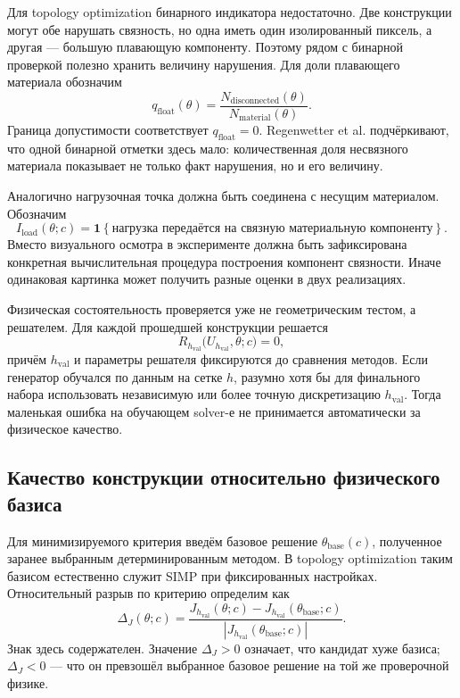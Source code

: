 Для topology optimization бинарного индикатора недостаточно. Две конструкции могут обе нарушать связность, но одна иметь один изолированный пиксель, а другая --- большую плавающую компоненту. Поэтому рядом с бинарной проверкой полезно хранить величину нарушения. Для доли плавающего материала обозначим
\begin{equation}
 q_{\mathrm{float}}(\theta)
 =
 \frac{N_{\mathrm{disconnected}}(\theta)}
 {N_{\mathrm{material}}(\theta)}.
\end{equation}
Граница допустимости соответствует $q_{\mathrm{float}}=0$. Regenwetter et al. подчёркивают, что одной бинарной отметки здесь мало: количественная доля несвязного материала показывает не только факт нарушения, но и его величину.

Аналогично нагрузочная точка должна быть соединена с несущим материалом. Обозначим
\begin{equation}
 I_{\mathrm{load}}(\theta;c)
 =
 \mathbf 1\!\left\{
  \text{нагрузка передаётся на связную материальную компоненту}
 \right\}.
\end{equation}
Вместо визуального осмотра в эксперименте должна быть зафиксирована конкретная вычислительная процедура построения компонент связности. Иначе одинаковая картинка может получить разные оценки в двух реализациях.

Физическая состоятельность проверяется уже не геометрическим тестом, а решателем. Для каждой прошедшей конструкции решается
\begin{equation}
 R_{h_{\mathrm{val}}}
 \bigl(U_{h_{\mathrm{val}}},\theta;c\bigr)=0,
\end{equation}
причём $h_{\mathrm{val}}$ и параметры решателя фиксируются до сравнения методов. Если генератор обучался по данным на сетке $h$, разумно хотя бы для финального набора использовать независимую или более точную дискретизацию $h_{\mathrm{val}}$. Тогда маленькая ошибка на обучающем solver-е не принимается автоматически за физическое качество.

\subsection{Качество конструкции относительно физического базиса}

Для минимизируемого критерия введём базовое решение $\theta_{\mathrm{base}}(c)$, полученное заранее выбранным детерминированным методом. В topology optimization таким базисом естественно служит SIMP при фиксированных настройках. Относительный разрыв по критерию определим как
\begin{equation}
 \Delta_J(\theta;c)
 =
 \frac{
  J_{h_{\mathrm{val}}}(\theta;c)
  -
  J_{h_{\mathrm{val}}}(\theta_{\mathrm{base}};c)
 }{
  \left|J_{h_{\mathrm{val}}}(\theta_{\mathrm{base}};c)\right|
 }.
\end{equation}
Знак здесь содержателен. Значение $\Delta_J>0$ означает, что кандидат хуже базиса; $\Delta_J<0$ --- что он превзошёл выбранное базовое решение на той же проверочной физике.

